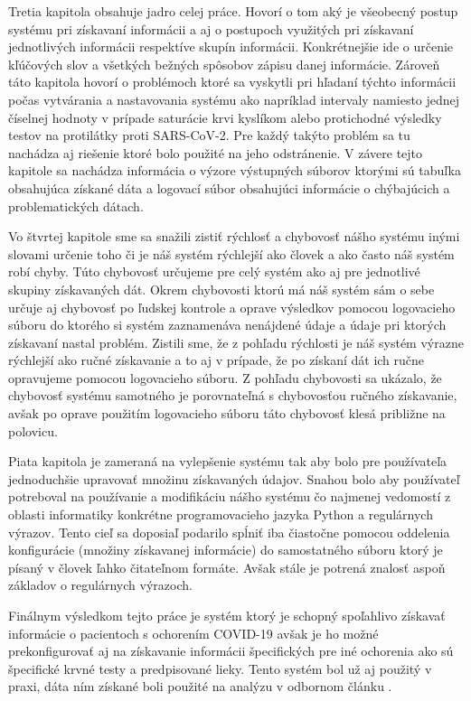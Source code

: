Tretia kapitola obsahuje jadro celej práce. Hovorí o tom aký je všeobecný postup systému pri získavaní informácii a aj o postupoch využitých pri získavaní jednotlivých informácii respektíve skupín informácii. Konkrétnejšie ide o určenie kľúčových slov a všetkých bežných spôsobov zápisu danej informácie. Zároveň táto kapitola hovorí o problémoch ktoré sa vyskytli pri hľadaní týchto informácii počas vytvárania a nastavovania systému ako napríklad intervaly namiesto jednej číselnej hodnoty v prípade saturácie krvi kyslíkom alebo protichodné výsledky testov na protilátky proti SARS-CoV-2. Pre každý takýto problém sa tu nachádza aj riešenie ktoré bolo použité na jeho odstránenie. V závere tejto kapitole sa nachádza informácia o výzore výstupných súborov ktorými sú tabuľka obsahujúca získané dáta a logovací súbor obsahujúci informácie o chýbajúcich a problematických dátach. 

Vo štvrtej kapitole sme sa snažili zistiť rýchlosť a  chybovosť nášho systému inými slovami určenie toho či je náš systém rýchlejší ako človek a ako často náš systém robí chyby. Túto chybovosť určujeme pre celý systém ako aj pre jednotlivé skupiny získavaných dát. Okrem chybovosti ktorú má náš systém sám o sebe určuje aj chybovosť po ľudskej kontrole a oprave výsledkov pomocou logovacieho súboru do ktorého si systém zaznamenáva nenájdené údaje a údaje pri ktorých získavaní nastal problém. Zistili sme, že z pohľadu rýchlosti je náš systém výrazne rýchlejší ako ručné získavanie a to aj v prípade, že po získaní dát ich ručne opravujeme pomocou logovacieho súboru. Z pohľadu chybovosti sa ukázalo, že chybovosť systému samotného je porovnateľná s chybovosťou ručného získavanie, avšak po oprave použitím logovacieho súboru táto chybovosť klesá približne na polovicu. 

Piata kapitola je zameraná na vylepšenie systému tak aby bolo pre používateľa jednoduchšie upravovať množinu získavaných údajov. Snahou bolo aby používateľ potreboval na používanie a modifikáciu nášho systému čo najmenej vedomostí z oblasti informatiky konkrétne programovacieho jazyka Python a regulárnych výrazov. Tento cieľ sa doposiaľ podarilo spĺniť iba čiastočne pomocou oddelenia konfigurácie (množiny získavanej informácie) do samostatného súboru ktorý je písaný v človek ľahko čitateľnom formáte. Avšak stále je potrená znalosť aspoň základov o regulárnych výrazoch.

Finálnym výsledkom tejto práce je systém ktorý je schopný spoľahlivo získavať informácie o pacientoch s ochorením COVID-19 avšak je ho možné prekonfigurovať aj na získavanie informácii špecifických pre iné ochorenia ako sú špecifické krvné testy a predpisované lieky. Tento systém bol už aj použitý v praxi, dáta ním získané boli použité na analýzu v odbornom článku \cite{sabaka}. 